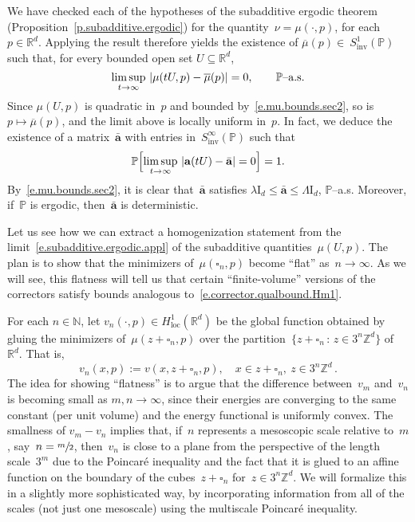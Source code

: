 \documentclass[11pt]{article} %
\let\oldsquare\square %
\renewcommand{\square}{\oldsquare}
\numberwithin{equation}{section}
\theoremstyle{definition}
\let\originalleft\left
\let\originalright\right
\renewcommand{\left}{\mathopen{}\mathclose\bgroup\originalleft}
\renewcommand{\right}{\aftergroup\egroup\originalright}
\newcommand*{\Id}{\ensuremath{\mathrm{I}_d}}
\newcommand*{\N}{\ensuremath{\mathbb{N}}}
\newcommand*{\Zd}{\ensuremath{\mathbb{Z}^d}}
\newcommand*{\Rd}{\ensuremath{\mathbb{R}^d}}
\renewcommand{\a}{\mathbf{a}}
\newcommand{\ahom}{\bar{\a}}
\newcommand{\cu}{\square}
\renewcommand{\P}{\mathbb{P}}
\begin{document}
We have checked each of the hypotheses of the subadditive ergodic theorem (Proposition~\ref{p.subadditive.ergodic}) for the quantity~$\nu = \mu(\cdot,p)$, for each $p\in\Rd$. Applying the result therefore yields the existence of 
$\overline{\mu}(p) \in\ S^1_{\mathrm{inv}}(\P)$ such that, for every bounded open set $U\subseteq \Rd$, 
\begin{equation}
\label{e.subadditive.ergodic.appl}
\limsup_{t\to\infty} \
\left| \mu(tU,p) - \overline{\mu}(p) \right| = 0, 
\qquad 
\mbox{$\P$--a.s.}
\end{equation}
Since $\mu(U,p)$ is quadratic in~$p$ and bounded by~\eqref{e.mu.bounds.sec2}, so is $p\mapsto \overline{\mu}(p)$, and the limit above is locally uniform in~$p$. In fact, we deduce the existence of a matrix~$\ahom$ with entries in~$S^\infty_{\mathrm{inv}}(\P)$ such that 
\begin{equation}
\label{e.conv.to.ahom}
\P \Bigl[ 
\limsup_{t\to\infty} \
\left| \a(tU) - \ahom \right| = 0
\Bigr] = 1.  
\end{equation}
By~\eqref{e.mu.bounds.sec2}, it is clear that~$\ahom$ satisfies $\lambda  \Id \leq \ahom \leq \Lambda  \Id$, $\P$--a.s.
Moreover, if~$\P$ is ergodic, then~$\ahom$ is deterministic. 

\smallskip

Let us see how we can extract a homogenization statement from the limit~\eqref{e.subadditive.ergodic.appl} of the subadditive quantities~$\mu(U,p)$. 
The plan is to show that the minimizers of~$\mu(\cu_n,p)$ become ``flat'' as~$n\to \infty$. As we will see, this flatness will tell us that certain ``finite-volume'' versions of the correctors satisfy bounds analogous to~\eqref{e.corrector.qualbound.Hm1}. 

For each $n\in\N$, let $v_n(\cdot,p) \in H^1_{\mathrm{loc}}(\Rd)$ be the global function obtained by gluing the minimizers of~$\mu(z+\cu_n,p)$ over the partition~$\{ z+\cu_n \,:\, z\in 3^n\Zd \}$ of~$\Rd$. That is, 
\begin{equation*}
v_n(x,p) := 
v(x,z+\cu_n,p), \quad x \in z+\cu_n, \ z\in3^n\Zd\,.
\end{equation*}
The idea for showing ``flatness'' is to argue that the difference between~$v_m$ and~$v_n$ is becoming small as $m,n\to \infty$, since their energies are converging to the same constant (per unit volume) and the energy functional is uniformly convex. 
The smallness of $v_m - v_n$ implies that, if~$n$ represents a mesoscopic scale relative to~$m$, say~$n=\sfrac m2$, then~$v_n$ is close to a plane from the perspective of the length scale~$3^m$ due to the Poincar\'e inequality and the fact that it is glued to an affine function on the boundary of the cubes~$z+\cu_n$ for~$z\in 3^n\Zd$. We will formalize this in a slightly more sophisticated way, by incorporating information from all of the scales (not just one mesoscale) using the multiscale Poincar\'e inequality. 
\end{document}

